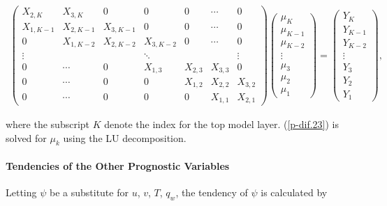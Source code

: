 \begin{eqnarray}
\left(\begin{array}{lllllll}
 X_{2,K}   & X_{3,K}   & 0         & 0         & 0         & \cdots    & 0       \\
 X_{1,K-1} & X_{2,K-1} & X_{3,K-1} & 0         & 0         & \cdots    & 0       \\
 0         & X_{1,K-2} & X_{2,K-2} & X_{3,K-2} & 0         & \cdots    & 0       \\
 \vdots    &           &           & \ddots    &           &           & \vdots  \\
 0         & \cdots    & 0         & X_{1,3}   & X_{2,3}   & X_{3,3}   & 0       \\
 0         & \cdots    & 0         & 0         & X_{1,2}   & X_{2,2}   & X_{3,2} \\
 0         & \cdots    & 0         & 0         & 0         & X_{1,1}   & X_{2,1}
\end{array}\right)
\left(\begin{array}{l}
 \mu_K \\
 \mu_{K-1} \\
 \mu_{K-2} \\
 \vdots \\
 \mu_3 \\
 \mu_2 \\
 \mu_1
\end{array}\right)
= \left(
\begin{array}{l}
 Y_K \\
 Y_{K-1} \\
 Y_{K-2} \\
 \vdots \\
 Y_3 \\
 Y_2 \\
 Y_1
\end{array}
\right), \label{p-dif.23}
\end{eqnarray}

where the subscript \(K\) denote the index for the top model layer. (\ref{p-dif.23}) is solved for \(\mu_k\) using the LU decomposition.

\hypertarget{tendencies-of-the-other-prognostic-variables}{%
\paragraph{Tendencies of the Other Prognostic Variables}\label{tendencies-of-the-other-prognostic-variables}}

Letting \(\psi\) be a substitute for \(u\), \(v\), \(T\), \(q_w\), the tendency of \(\psi\) is calculated by

